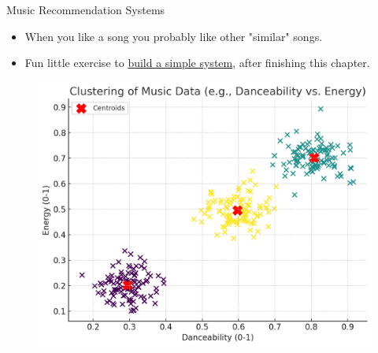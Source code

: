 \documentclass[serif, aspectratio=169]{beamer}
\begin{document}
\begin{frame}{Music Recommendation Systems }
\begin{itemize}
    \item When you like a song you probably like other "similar" songs.
    \item Fun little exercise to \href{https://machinelearninggeek.com/spotify-song-recommender-system-in-python/}{build a simple system}, after finishing this chapter.
\end{itemize}

    \begin{figure}
        \includegraphics[scale=0.4]{pic/figs/Music Clustering2.png}
        \centering
    \end{figure}

        
\end{frame}
\end{document}
